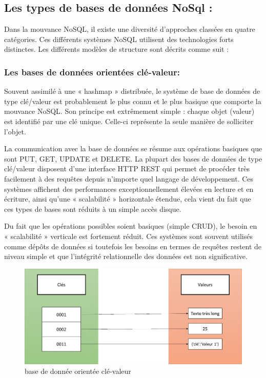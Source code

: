 \subsection{Les types de bases de données NoSql :}
Dans la mouvance NoSQL, il existe une diversité d’approches classées en quatre catégories. Ces différents systèmes NoSQL utilisent des technologies forts distinctes. Les différents modèles de structure sont décrits comme suit :

\subsubsection{Les bases de données orientées clé-valeur:}
Souvent assimilé à une « hashmap » distribuée, le système de base de données de type clé/valeur est probablement le plus connu et le plus basique que comporte la mouvance NoSQL. Son principe est extrêmement simple : chaque objet (valeur) est identifié par une clé unique. Celle-ci représente la seule manière de solliciter l’objet.

La communication avec la base de données se résume aux opérations basiques que sont PUT, GET, UPDATE et DELETE. La plupart des bases de données de type clé/valeur disposent d’une interface HTTP REST qui permet de procéder très facilement à des requêtes depuis n’importe quel langage de développement. Ces systèmes affichent des performances exceptionnellement élevées en lecture et en écriture, ainsi qu’une « scalabilité » horizontale étendue, cela vient du fait que ces types de bases sont réduits à un simple accès disque.

Du fait que les opérations possibles soient basiques (simple CRUD), le besoin en « scalabilité » verticale est fortement réduit. Ces systèmes sont souvent utilisés comme dépôts de données si toutefois les besoins en termes de requêtes restent de niveau simple et que l’intégrité relationnelle des données est non significative.

\begin{figure}[h]
	\centering
    \includegraphics[scale=0.5]{img/part1/4.3}
    \caption{base de donnée orientée clé-valeur}
\end{figure}

